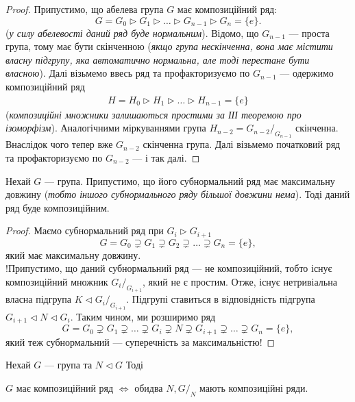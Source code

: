 \documentclass{math_library}
\begin{document}
\begin{proof}
Припустимо, що абелева група $G$ має композиційний ряд:
\[
G = G_0 \triangleright G_1 \triangleright \dots \triangleright G_{n-1} \triangleright G_n = \{e\}.
\]
(\textit{у силу абелевості даний ряд буде нормальним}). Відомо, що $G_{n-1}$ --- проста група, тому має бути скінченною (\textit{якщо група нескінченна, вона має містити власну підгрупу, яка автоматично нормальна, але тоді перестане бути власною}). Далі візьмемо ввесь ряд та профакторизуємо по $G_{n-1}$ --- одержимо композиційний ряд
\begin{align*}
H = H_0 \triangleright H_1 \triangleright \dots \triangleright H_{n-1} = \{e\}
\end{align*}
(\textit{композиційні множники залишаються простими за ІІІ теоремою про ізоморфізм}). Аналогічними міркуваннями група $H_{n-2} = G_{n-2}/_{G_{n-1}}$ скінченна. Внаслідок чого тепер вже $G_{n-2}$ скінченна група. Далі візьмемо початковий ряд та профакторизуємо по $G_{n-2}$ --- і так далі.
\end{proof}

\begin{proposition}
Нехай $G$ --- група. Припустимо, що його субнормальний ряд має максимальну довжину (\textit{тобто іншого субнормального ряду більшої довжини нема}). Тоді даний ряд буде композиційним.
\end{proposition}

\begin{proof}
Маємо субнормальний ряд при $G_i \triangleright G_{i+1}$
\[
G = G_0 \supsetneq G_1 \supsetneq G_2 \supsetneq \dots \supsetneq G_n = \{e\},
\]
який має максимальну довжину.\\
!Припустимо, що даний субнормальний ряд --- не композиційний, тобто існує композиційний множник ${G_i}/_{G_{i+1}}$, який не є простим. Отже, існує нетривіальна власна підгрупа $K \triangleleft {G_i}/_{G_{i+1}}$. Підгрупі ставиться в відповідність підгрупа $G_{i+1} \triangleleft N \triangleleft G_i$. Таким чином, ми розширимо ряд 
\[
G = G_0 \supsetneq G_1 \supsetneq \dots \supsetneq G_i \supsetneq N \supsetneq G_{i+1} \supsetneq \dots \supsetneq G_n = \{e\},
\] 
який теж субнормальний --- суперечність за максимальністю!
\end{proof}

\begin{proposition}
Нехай $G$ --- група та $N \triangleleft G$ Тоді
\begin{center}
$G$ має композиційний ряд $\iff$ обидва $N,G/_N$ мають композиційні ряди.
\end{center}
\end{proposition}
\end{document}
